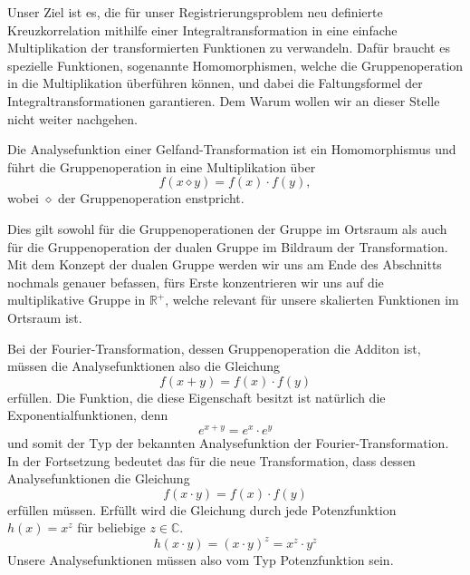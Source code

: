 Unser Ziel ist es, die für unser Registrierungsproblem neu definierte 
Kreuzkorrelation mithilfe einer Integraltransformation in eine 
einfache Multiplikation der transformierten Funktionen zu verwandeln.
Dafür braucht es spezielle Funktionen, sogenannte Homomorphismen, welche 
die Gruppenoperation in die Multiplikation überführen können, und dabei 
die Faltungsformel der Integraltransformationen garantieren.
Dem Warum wollen wir an dieser Stelle nicht weiter nachgehen.
\begin{satz}
    Die Analysefunktion einer Gelfand-Transformation ist ein 
    Homomorphismus und führt die Gruppenoperation in eine 
    Multiplikation über
    \[
        f(x \diamond y) 
        = f(x) \cdot f(y)
        ,
    \]
    wobei $\diamond$ der Gruppenoperation enstpricht.
\end{satz}
Dies gilt sowohl für die Gruppenoperationen der Gruppe im Ortsraum als auch 
für die Gruppenoperation der dualen Gruppe im Bildraum der Transformation.
Mit dem Konzept der dualen Gruppe werden wir uns am Ende des Abschnitts 
nochmals genauer befassen, fürs Erste konzentrieren wir uns auf die 
multiplikative Gruppe in $\mathbb{R^+}$, welche relevant für unsere 
skalierten Funktionen im Ortsraum ist.
\medskip

Bei der Fourier-Transformation, dessen Gruppenoperation die Additon ist, 
müssen die Analysefunktionen also die Gleichung 
\begin{equation}
    f(x + y) 
    = f(x) \cdot f(y)
    \label{mellin:hom1}
\end{equation}
erfüllen. 
Die Funktion, die diese Eigenschaft besitzt ist natürlich die 
Exponentialfunktionen, denn 
\begin{equation}
    e^{x + y} 
    = e^x \cdot e^y
    \label{mellin:exp}
\end{equation}
und somit der Typ der bekannten Analysefunktion der Fourier-Transformation.
In der Fortsetzung bedeutet das für die neue Transformation, dass dessen 
Analysefunktionen die Gleichung
\begin{equation}
    f(x \cdot y) 
    = f(x) \cdot f(y)
    \label{mellin:hom2}
\end{equation}
erfüllen müssen.
Erfüllt wird die Gleichung durch jede Potenzfunktion $h(x) = x^{z}$ für 
beliebige $z \in \mathbb{C}$.
\begin{equation}
    h(x \cdot y) 
    = (x \cdot y)^{z} = x^{z} \cdot y^{z}
\end{equation}
Unsere Analysefunktionen müssen also vom Typ Potenzfunktion sein.

